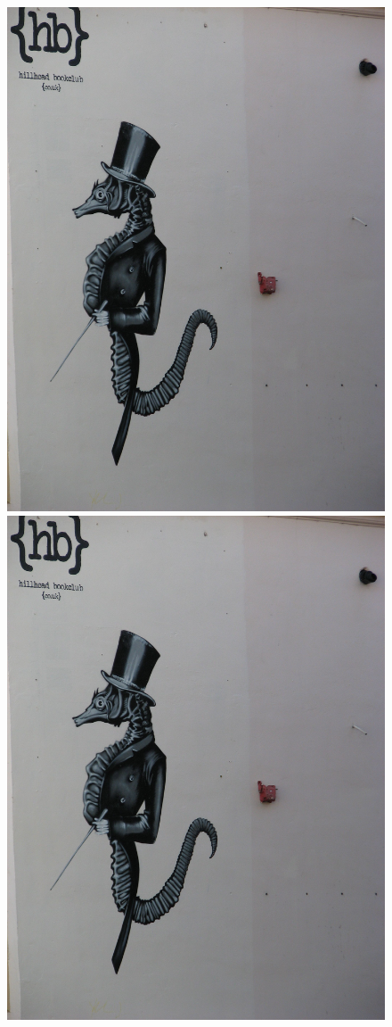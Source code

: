 \begin{figure}[h!]
\includegraphics[scale=0.10]{hb1}
\includegraphics[scale=0.10]{hb1}

\end{figure}
